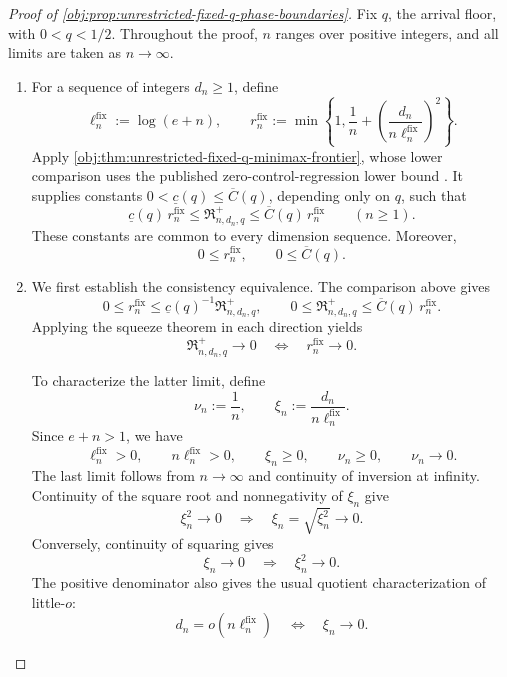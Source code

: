 \begin{proof}[Proof of \cref{obj:prop:unrestricted-fixed-q-phase-boundaries}]
Fix \(q\), the arrival floor, with \(0<q<1/2\). Throughout the proof, \(n\) ranges over positive integers, and all limits are taken as \(n\to\infty\).

\begin{enumerate}
\item For a sequence of integers \(d_n\ge1\), define
\[
\ell_n^{\mathrm{fix}}:=\log(e+n),
\qquad
r_n^{\mathrm{fix}}
:=
\min\left\{1,\frac1n+
\left(\frac{d_n}{n\ell_n^{\mathrm{fix}}}\right)^2\right\}.
\]
Apply \cref{obj:thm:unrestricted-fixed-q-minimax-frontier}, whose lower comparison uses the published zero-control-regression lower bound
\citep[Theorem~2, Section~3.2, p.~9, and its proof in Section~C.5, pp.~39--44]{ZengBalakrishnanHanKennedy2026}.
It supplies constants \(0<\underline c(q)\le\overline C(q)\), depending only on \(q\), such that
\[
\underline c(q)\,r_n^{\mathrm{fix}}
\le \mathfrak R^{+}_{n,d_n,q}
\le \overline C(q)\,r_n^{\mathrm{fix}}
\qquad(n\ge1).
\]
These constants are common to every dimension sequence. Moreover,
\[
0\le r_n^{\mathrm{fix}},
\qquad
0\le\overline C(q).
\]

\item We first establish the consistency equivalence. The comparison above gives
\[
0\le r_n^{\mathrm{fix}}
\le \underline c(q)^{-1}\mathfrak R^{+}_{n,d_n,q},
\qquad
0\le\mathfrak R^{+}_{n,d_n,q}
\le\overline C(q)\,r_n^{\mathrm{fix}}.
\]
Applying the squeeze theorem in each direction yields
\[
\mathfrak R^{+}_{n,d_n,q}\longrightarrow0
\quad\Longleftrightarrow\quad
r_n^{\mathrm{fix}}\longrightarrow0.
\]

To characterize the latter limit, define
\[
\nu_n:=\frac1n,
\qquad
\xi_n:=\frac{d_n}{n\ell_n^{\mathrm{fix}}}.
\]
Since \(e+n>1\), we have
\[
\ell_n^{\mathrm{fix}}>0,
\qquad
n\ell_n^{\mathrm{fix}}>0,
\qquad
\xi_n\ge0,
\qquad
\nu_n\ge0,
\qquad
\nu_n\longrightarrow0.
\]
The last limit follows from \(n\to\infty\) and continuity of inversion at infinity. Continuity of the square root and nonnegativity of \(\xi_n\) give
\[
\xi_n^2\longrightarrow0
\quad\Longrightarrow\quad
\xi_n=\sqrt{\xi_n^2}\longrightarrow0.
\]
Conversely, continuity of squaring gives
\[
\xi_n\longrightarrow0
\quad\Longrightarrow\quad
\xi_n^2\longrightarrow0.
\]
The positive denominator also gives the usual quotient characterization of little-\(o\):
\[
d_n=o\!\left(n\ell_n^{\mathrm{fix}}\right)
\quad\Longleftrightarrow\quad
\xi_n\longrightarrow0.
\]


\end{enumerate}
\end{proof}
